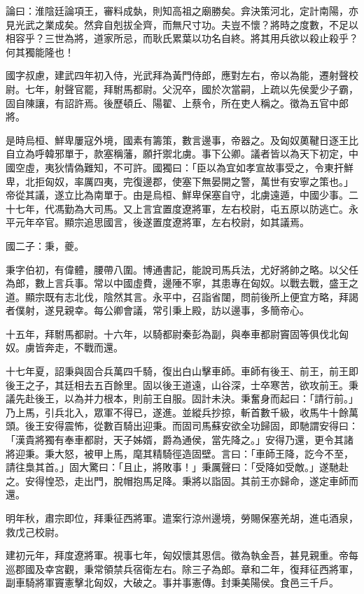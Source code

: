 \begin{pinyinscope}
論曰：淮陰廷論項王，審料成埶，則知高祖之廟勝矣。弇決策河北，定計南陽，亦見光武之業成矣。然弇自剋拔全齊，而無尺寸功。夫豈不懷？將時之度數，不足以相容乎？三世為將，道家所忌，而耿氏累葉以功名自終。將其用兵欲以殺止殺乎？何其獨能隆也！

國字叔慮，建武四年初入侍，光武拜為黃門侍郎，應對左右，帝以為能，遷射聲校尉。七年，射聲官罷，拜駙馬都尉。父況卒，國於次當嗣，上疏以先侯愛少子霸，固自陳讓，有詔許焉。後歷頓丘、陽翟、上蔡令，所在吏人稱之。徵為五官中郎將。

是時烏桓、鮮卑屢寇外境，國素有籌策，數言邊事，帝器之。及匈奴薁鞬日逐王比自立為呼韓邪單于，款塞稱藩，願扞禦北虜。事下公卿。議者皆以為天下初定，中國空虛，夷狄情偽難知，不可許。國獨曰：「臣以為宜如孝宣故事受之，令東扞鮮卑，北拒匈奴，率厲四夷，完復邊郡，使塞下無晏開之警，萬世有安寧之策也。」帝從其議，遂立比為南單于。由是烏桓、鮮卑保塞自守，北虜遠遁，中國少事。二十七年，代馮勤為大司馬。又上言宜置度遼將軍，左右校尉，屯五原以防逃亡。永平元年卒官。顯宗追思國言，後遂置度遼將軍，左右校尉，如其議焉。

國二子：秉，夔。

秉字伯初，有偉體，腰帶八圍。博通書記，能說司馬兵法，尤好將帥之略。以父任為郎，數上言兵事。常以中國虛費，邊陲不寧，其患專在匈奴。以戰去戰，盛王之道。顯宗既有志北伐，陰然其言。永平中，召詣省闥，問前後所上便宜方略，拜謁者僕射，遂見親幸。每公卿會議，常引秉上殿，訪以邊事，多簡帝心。

十五年，拜駙馬都尉。十六年，以騎都尉秦彭為副，與奉車都尉竇固等俱伐北匈奴。虜皆奔走，不戰而還。

十七年夏，詔秉與固合兵萬四千騎，復出白山擊車師。車師有後王、前王，前王即後王之子，其廷相去五百餘里。固以後王道遠，山谷深，士卒寒苦，欲攻前王。秉議先赴後王，以為并力根本，則前王自服。固計未決。秉奮身而起曰：「請行前。」乃上馬，引兵北入，眾軍不得已，遂進。並縱兵抄掠，斬首數千級，收馬牛十餘萬頭。後王安得震怖，從數百騎出迎秉。而固司馬蘇安欲全功歸固，即馳謂安得曰：「漢貴將獨有奉車都尉，天子姊婿，爵為通侯，當先降之。」安得乃還，更令其諸將迎秉。秉大怒，被甲上馬，麾其精騎徑造固壁。言曰：「車師王降，訖今不至，請往梟其首。」固大驚曰：「且止，將敗事！」秉厲聲曰：「受降如受敵。」遂馳赴之。安得惶恐，走出門，脫帽抱馬足降。秉將以詣固。其前王亦歸命，遂定車師而還。

明年秋，肅宗即位，拜秉征西將軍。遣案行涼州邊境，勞賜保塞羌胡，進屯酒泉，救戊己校尉。

建初元年，拜度遼將軍。視事七年，匈奴懷其恩信。徵為執金吾，甚見親重。帝每巡郡國及幸宮觀，秉常領禁兵宿衛左右。除三子為郎。章和二年，復拜征西將軍，副車騎將軍竇憲擊北匈奴，大破之。事并事憲傳。封秉美陽侯。食邑三千戶。


\end{pinyinscope}
